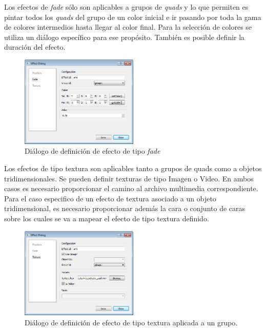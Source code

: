 Los efectos de \emph{fade} sólo son aplicables a grupos de \emph{quads} y lo que permiten es pintar todos los \emph{quads} del grupo de un color inicial e ir pasando por toda la gama de colores intermedios hasta llegar al color final. Para la selección de colores se utiliza un diálogo específico para ese propósito. También es posible definir la duración del efecto.

\begin{figure}[H]
  \centering
    \includegraphics[width=0.5\textwidth]{./Cap5_vmt/vmt_EfectDialog2.png}
  \caption{Diálogo de definición de efecto de tipo \emph{fade}}
  \label{fig:VMT-EffectFade}
\end{figure}

Los efectos de tipo textura son aplicables tanto a grupos de quads como a objetos tridimensionales. Se pueden definir texturas de tipo Imagen o Video. En ambos casos es necesario proporcionar el camino al archivo multimedia correspondiente. Para el caso especifico de un efecto de textura asociado a un objeto tridimensional, es necesario proporcionar además la cara o conjunto de caras sobre los cuales se va a mapear el efecto de tipo textura definido.

\begin{figure}[H]
  \centering
    \includegraphics[width=0.5\textwidth]{./Cap5_vmt/vmt_EfectDialog3.png}
  \caption{Diálogo de definición de efecto de tipo textura aplicada a un grupo.}
  \label{fig:VMT-EffectTexture}
\end{figure}

